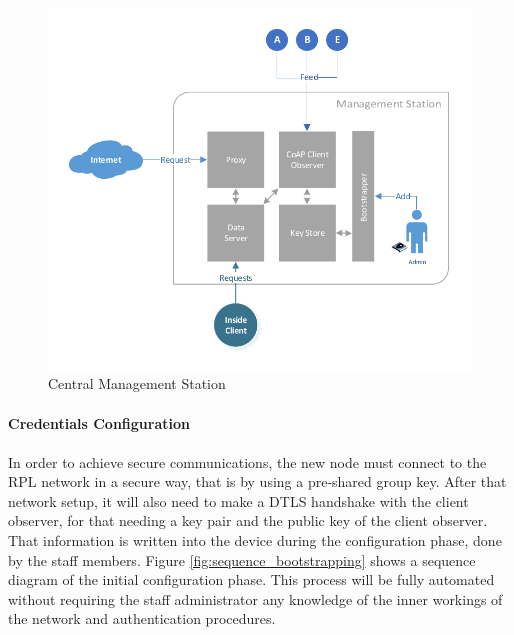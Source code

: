 \begin{figure}[h]
  \centering
  \includegraphics[width=0.92\linewidth]{figures/White_Box_Model.pdf}
  \caption{Central Management Station}
  \label{fig:core_components}
\end{figure}

\paragraph{\textbf{Credentials Configuration}}
\paragraph{}
In order to achieve secure communications, the new node must connect to the RPL network in a secure way, that is by using a pre-shared group key. After that network setup, it will also need to make a DTLS handshake with the client observer, for that needing a key pair and the public key of the client observer. That information is written into the device during the configuration phase, done by the staff members. Figure \ref{fig:sequence_bootstrapping} shows a sequence diagram of the initial configuration phase. This process will be fully automated without requiring the staff administrator any knowledge of the inner workings of the network and authentication procedures.

